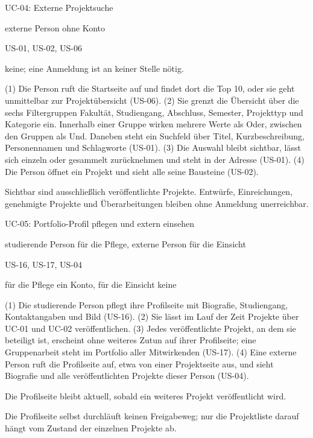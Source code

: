\begin{usecase}{UC-04: Externe Projektsuche}
	\item[Akteur:] externe Person ohne Konto
	\item[Bezug:] US-01, US-02, US-06
	\item[Vorbedingung:] keine; eine Anmeldung ist an keiner Stelle nötig.
	\item[Ablauf:] (1) Die Person ruft die Startseite auf und findet dort die Top 10, oder sie geht unmittelbar zur Projektübersicht (US-06). (2) Sie grenzt die Übersicht über die sechs Filtergruppen Fakultät, Studiengang, Abschluss, Semester, Projekttyp und Kategorie ein. Innerhalb einer Gruppe wirken mehrere Werte als Oder, zwischen den Gruppen als Und. Daneben steht ein Suchfeld über Titel, Kurzbeschreibung, Personennamen und Schlagworte (US-01). (3) Die Auswahl bleibt sichtbar, lässt sich einzeln oder gesammelt zurücknehmen und steht in der Adresse (US-01). (4) Die Person öffnet ein Projekt und sieht alle seine Bausteine (US-02).
	\item[Nachbedingung:] Sichtbar sind ausschließlich veröffentlichte Projekte. Entwürfe, Einreichungen, genehmigte Projekte und Überarbeitungen bleiben ohne Anmeldung unerreichbar.
\end{usecase}

\begin{usecase}{UC-05: Portfolio-Profil pflegen und extern einsehen}
	\item[Akteure:] studierende Person für die Pflege, externe Person für die Einsicht
	\item[Bezug:] US-16, US-17, US-04
	\item[Vorbedingung:] für die Pflege ein Konto, für die Einsicht keine
	\item[Ablauf:] (1) Die studierende Person pflegt ihre Profilseite mit Biografie, Studiengang, Kontaktangaben und Bild (US-16). (2) Sie lässt im Lauf der Zeit Projekte über UC-01 und UC-02 veröffentlichen. (3) Jedes veröffentlichte Projekt, an dem sie beteiligt ist, erscheint ohne weiteres Zutun auf ihrer Profilseite; eine Gruppenarbeit steht im Portfolio aller Mitwirkenden (US-17). (4) Eine externe Person ruft die Profilseite auf, etwa von einer Projektseite aus, und sieht Biografie und alle veröffentlichten Projekte dieser Person (US-04).
	\item[Nachbedingung:] Die Profilseite bleibt aktuell, sobald ein weiteres Projekt veröffentlicht wird.
	\item[Abgrenzung:] Die Profilseite selbst durchläuft keinen Freigabeweg; nur die Projektliste darauf hängt vom Zustand der einzelnen Projekte ab.
\end{usecase}

